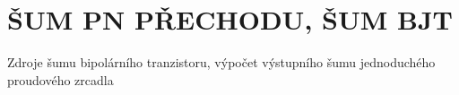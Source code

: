 \section{ŠUM PN PŘECHODU, ŠUM BJT}
Zdroje šumu bipolárního tranzistoru, výpočet výstupního šumu jednoduchého proudového zrcadla